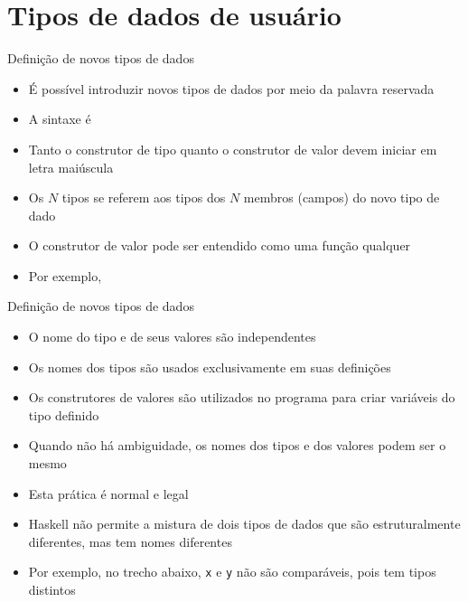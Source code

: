 \section{Tipos de dados de usuário}

\begin{frame}[fragile]{Definição de novos tipos de dados}

    \begin{itemize}
        \item É possível introduzir novos tipos de dados por meio da palavra reservada

        \item A sintaxe é


        \item Tanto o construtor de tipo quanto o construtor de valor devem iniciar em
            letra maiúscula

        \item Os $N$ tipos se referem aos tipos dos $N$ membros (campos) do novo tipo de dado

        \item O construtor de valor pode ser entendido como uma função qualquer

        \item Por exemplo, 

    \end{itemize}

\end{frame}

\begin{frame}[fragile]{Definição de novos tipos de dados}

    \begin{itemize}
        \item O nome do  tipo e de seus valores são independentes

        \item Os nomes dos tipos são usados exclusivamente em suas definições

        \item Os construtores de valores são utilizados no programa para criar variáveis do
            tipo definido

        \item Quando não há ambiguidade, os nomes dos tipos e dos valores podem ser o mesmo

        \item Esta prática é normal e legal

        \item Haskell não permite a mistura de dois tipos de dados que são estruturalmente
            diferentes, mas tem nomes diferentes

        \item Por exemplo, no trecho abaixo,
        \texttt{x} e \texttt{y} não são comparáveis, pois tem tipos distintos
    \end{itemize}

\end{frame}


